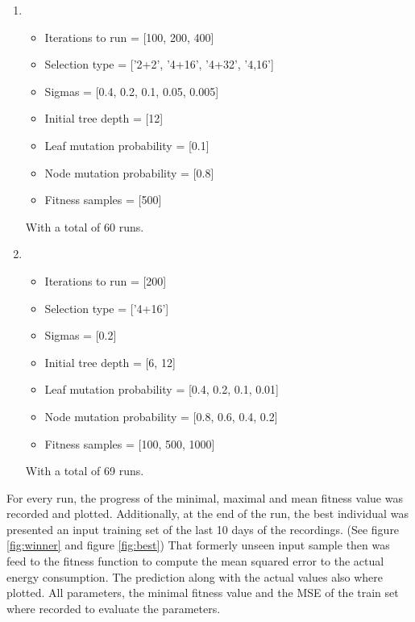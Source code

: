 \documentclass[conference]{IEEEtran}
\begin{document}
\begin{enumerate}
\item 
\begin{itemize}
\item Iterations to run = [100, 200, 400]
\item Selection type = ['2+2',  '4+16', '4+32', '4,16']
\item Sigmas = [0.4, 0.2, 0.1, 0.05, 0.005]
\item Initial tree depth = [12]
\item Leaf mutation probability = [0.1]
\item Node mutation probability = [0.8]
\item Fitness samples = [500]
\end{itemize}

With a total of 60 runs.\\

\item
\begin{itemize}
\item Iterations to run = [200]
\item Selection type = ['4+16']
\item Sigmas = [0.2]
\item Initial tree depth = [6, 12]
\item Leaf mutation probability = [0.4, 0.2, 0.1, 0.01]
\item Node mutation probability = [0.8, 0.6, 0.4, 0.2]
\item Fitness samples = [100, 500, 1000]
\end{itemize}
With a total of 69 runs.\\
\end{enumerate}
For every run, the progress of the minimal, maximal and mean fitness value was recorded and plotted. Additionally, at the end of the run, the best individual was presented an input training set of the last 10 days of the recordings. (See figure \ref{fig:winner} and figure \ref{fig:best}) That formerly unseen input sample then was feed to the fitness function to compute the mean squared error to the actual energy consumption. The prediction along with the actual values also where plotted. All parameters, the minimal fitness value and the MSE of the train set where recorded to evaluate the parameters.
\end{document}
